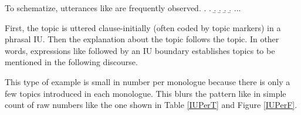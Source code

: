 To schematize,
utterances like \Next are frequently observed.
%
\ex.
 \a.  \tp{\dvline}
 \b.  \tp{\dvline}
 \b.  \tp{\dvline}
 \b.  \tp{\dvline}
 \b. ...

First, the topic is uttered clause-initially (often coded by topic markers) in a phrasal IU.
Then the explanation about the topic follows the topic.
In other words, expressions like \Last[a] followed by an IU boundary establishes topics to be mentioned in the following discourse.

This type of example is small in number per monologue because there is only a few topics introduced in each monologue.
This blurs the pattern like \Last in simple count of raw numbers like the one shown in Table \ref{IUPerT} and Figure \ref{IUPerF}.
%
%
